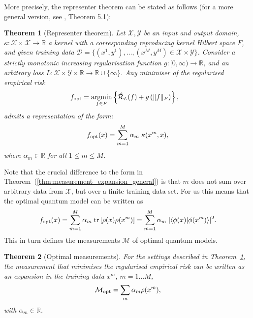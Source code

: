 \documentclass[aps, reprint, onecolumn, nofootinbib, longbibliography]{revtex4-2}
\newtheorem{theorem}{Theorem}[]
\newcommand{\tr}[1]{ \mathrm{tr}\left[#1\right] }
\newcommand{\meas}{\mathcal{M}}
\begin{document}
More precisely, the representer theorem can be stated as follows (for a more general version, see \cite{scholkopf2002learning}, Theorem 5.1):
\begin{theorem}[Representer theorem]\label{thm:representer_quantum}
Let $\mathcal{X}, \mathcal{Y}$ be an input and output domain, $\kappa : \mathcal{X} \times \mathcal{X} \to \mathbb{R}$ a kernel with a corresponding reproducing kernel Hilbert space $F$, and given training data $\mathcal{D} = \{(x^1, y^1), \dotsc, (x^M, y^M) \in \mathcal{X} \times \mathcal{Y}\}$. Consider a strictly monotonic increasing regularisation function $g \colon [0, \infty) \to \mathbb{R}$, and an arbitrary loss $L \colon \mathcal{X} \times \mathcal{Y}\times \mathbb{R} \to \mathbb{R}\cup \lbrace \infty \rbrace$. Any minimiser of the regularised empirical risk
\begin{equation}
 f_{\rm opt} = \underset{f \in F}{\mathrm{argmin}} \left\lbrace \hat{\mathcal{R}}_L(f) + g\left( \lVert f \rVert_F \right) \right \rbrace, \quad 
\end{equation}
admits a representation of the form:
\begin{equation}
  f_{\rm opt}(x) = \sum_{m = 1}^M \alpha_m \; \kappa(x^m, x),
\end{equation}
where $\alpha_m \in \mathbb{R}$ for all $1 \le m \le M$.
\end{theorem}
Note that the crucial difference to the form in Theorem~(\ref{thm:measurement_expansion_general}) is that $m$ does not sum over arbitrary data from $\mathcal{X}$, but over a finite training data set.
For us this means that the optimal quantum model can be written as
\begin{equation}\label{eq:optimal_model}
    f_{\rm opt}(x) =\sum_{m = 1}^M \alpha_m \; \tr{\rho(x) \rho(x^m)} =  \sum_{m = 1}^M \alpha_m \; |\langle \phi(x) | \phi(x^m) \rangle |^2.
\end{equation}
This in turn defines the measurements $\meas$ of optimal quantum models.
\begin{theorem}[Optimal measurements] \label{thm:opt_meas}
For the settings described in Theorem~\ref{thm:representer_quantum}, the measurement that minimises the regularised empirical risk can be written as an expansion in the training data $x^m$, $m=1 \dots M$,
\begin{equation}\label{eq:opt_meas} 
 \meas_{\rm opt} =   \sum_{m}  \alpha_{m}  \rho(x^{m}),
\end{equation}
with $\alpha_m \in \mathbb{R}$.
\end{theorem}
\end{document}
